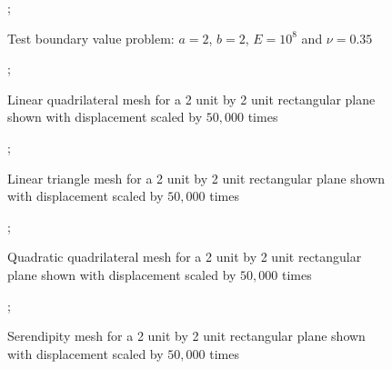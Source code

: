 \documentclass{article}
\begin{document}
\begin{figure}
    ;
    \caption{Test boundary value problem: $a = 2$, $b = 2$, $E = 10^8$ and $\nu = 0.35$}
\centering
\end{figure}


\begin{figure}
    ;
    \caption{Linear quadrilateral mesh for a 2 unit by 2 unit rectangular plane shown with displacement scaled by $50,000$ times}
\centering
\end{figure}

\begin{figure}
    ;
    \caption{Linear triangle mesh for a 2 unit by 2 unit rectangular plane shown with displacement scaled by $50,000$ times}
\centering
\end{figure}

\begin{figure}
    ;
    \caption{Quadratic quadrilateral mesh for a 2 unit by 2 unit rectangular plane shown with displacement scaled by $50,000$ times}
\centering
\end{figure}


\begin{figure}
    ;
    \caption{Serendipity mesh for a 2 unit by 2 unit rectangular plane shown with displacement scaled by $50,000$ times}
\centering
\end{figure}
\end{document}

